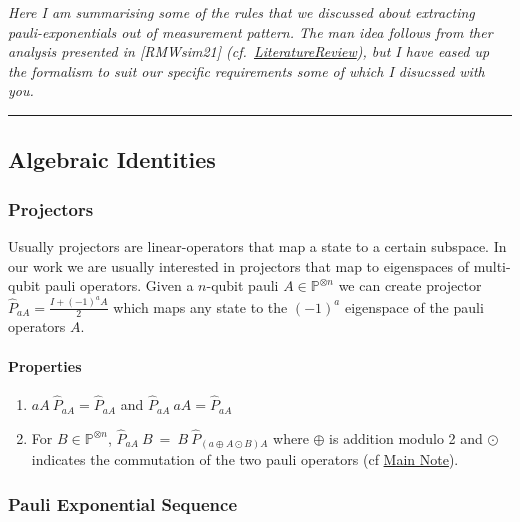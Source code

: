 \documentclass[
]{article}
\author{}
\date{}
\providecommand{\tightlist}{%
  \setlength{\itemsep}{0pt}\setlength{\parskip}{0pt}}
\begin{document}
\emph{Here I am summarising some of the rules that we discussed about
extracting pauli-exponentials out of measurement pattern. The man idea
follows from ther analysis presented in {[}RMWsim21{]}
(cf.~\url{LiteratureReview}), but I have eased up the formalism to suit
our specific requirements some of which I disucssed with you.}

\begin{center}\rule{0.5\linewidth}{0.5pt}\end{center}

\hypertarget{algebraic-identities}{%
\subsection{Algebraic Identities}\label{algebraic-identities}}

\hypertarget{projectors}{%
\subsubsection{Projectors}\label{projectors}}

Usually projectors are linear-operators that map a state to a certain
subspace. In our work we are usually interested in projectors that map
to eigenspaces of multi-qubit pauli operators. Given a \(n\)-qubit pauli
\(A \in \mathbb{P}^{\otimes n}\) we can create projector
\(\hat{P}_{aA} = \frac{I+(-1)^{a}A}{2}\) which maps any state to the
\((-1)^a\) eigenspace of the pauli operators \(A\).

\hypertarget{properties}{%
\paragraph{Properties}\label{properties}}

\begin{enumerate}
\def\labelenumi{\arabic{enumi}.}
\tightlist
\item
  \(aA \:\hat{P}_{aA} = \hat{P}_{aA}\) and
  \(\hat{P}_{aA} \:aA = \hat{P}_{aA}\)
\item
  For \(B \in \mathbb{P}^{\otimes n}\),
  \(\hat{P}_{aA} \: B \: = \: B \: \hat{P}_{(a \oplus A \odot B)A}\)
  where \(\oplus\) is addition modulo 2 and \(\odot\) indicates the
  commutation of the two pauli operators (cf \href{Main\%20Note}{Main
  Note}).
\end{enumerate}

\hypertarget{pauli-exponential-sequence}{%
\subsubsection{Pauli Exponential
Sequence}\label{pauli-exponential-sequence}}
\end{document}
